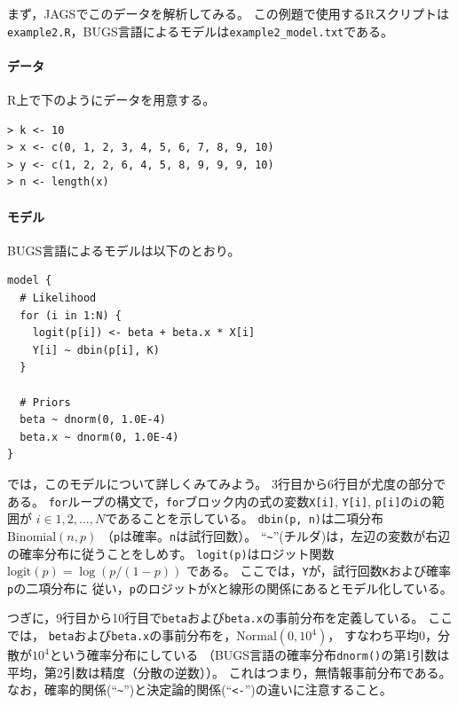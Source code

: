\documentclass[11pt,uplatex]{jsarticle}
\begin{document}
まず，\textsf{JAGS}でこのデータを解析してみる。
この例題で使用する\textsf{R}スクリプトは\texttt{example2.R}，\textsf{BUGS}言語によるモデルは\texttt{example2\_model.txt}である。

\paragraph{データ}
\textsf{R}上で下のようにデータを用意する。
\begin{lstlisting}
> k <- 10
> x <- c(0, 1, 2, 3, 4, 5, 6, 7, 8, 9, 10)
> y <- c(1, 2, 2, 6, 4, 5, 8, 9, 9, 9, 10)
> n <- length(x)
\end{lstlisting}


\paragraph{モデル}
BUGS言語によるモデルは以下のとおり。

\begin{lstlisting}
model {
  # Likelihood
  for (i in 1:N) {
    logit(p[i]) <- beta + beta.x * X[i]
    Y[i] ~ dbin(p[i], K)
  }

  # Priors
  beta ~ dnorm(0, 1.0E-4)
  beta.x ~ dnorm(0, 1.0E-4)
}
\end{lstlisting}

では，このモデルについて詳しくみてみよう。
3行目から6行目が尤度の部分である。
\texttt{for}ループの構文で，\texttt{for}ブロック内の式の変数\texttt{X[i]}, \texttt{Y[i]}, 
\texttt{p[i]}の\texttt{i}の範囲が
$i \in 1, 2, \dots, N$であることを示している。
\texttt{dbin(p, n)}は二項分布$\mathrm{Binomial}(n, p)$
（\texttt{p}は確率。\texttt{n}は試行回数）。
``\texttt{\textasciitilde}''(チルダ)は，左辺の変数が右辺の確率分布に従うことをしめす。
\texttt{logit(p)}はロジット関数
$\mathrm{logit}(p) = \log(p/(1-p))$
である。
ここでは，\texttt{Y}が，試行回数\texttt{K}および確率\texttt{p}の二項分布に
従い，\texttt{p}のロジットが\texttt{X}と線形の関係にあるとモデル化している。

つぎに，9行目から10行目で\texttt{beta}および\texttt{beta.x}の事前分布を定義している。
ここでは，
\texttt{beta}および\texttt{beta.x}の事前分布を，$\mathrm{Normal}(0, 10^{4})$，
すなわち平均0，分散が$10^{4}$という確率分布にしている
（BUGS言語の確率分布\texttt{dnorm()}の第1引数は平均，第2引数は精度（分散の逆数））。
これはつまり，無情報事前分布である。
なお，確率的関係(``\texttt{\textasciitilde}'')と決定論的関係(``\texttt{<-}'')の違いに注意すること。
\end{document}
